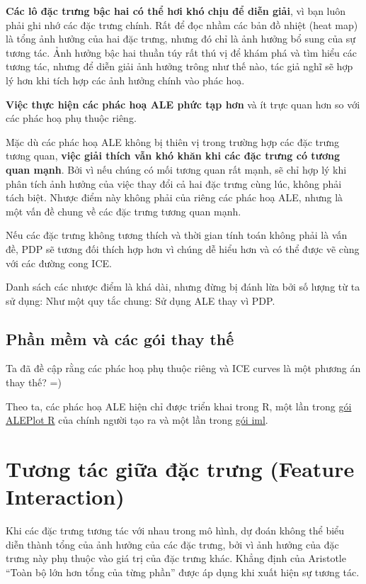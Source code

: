 \textbf{Các lô đặc trưng bậc hai có thể hơi khó chịu để diễn giải}, vì bạn luôn phải ghi nhớ các đặc trưng chính. Rất để đọc nhầm các bản đồ nhiệt (heat map) là tổng ảnh hưởng của hai đặc trưng, nhưng đó chỉ là ảnh hưởng bổ sung của sự tương tác. Ảnh hưởng bậc hai thuần túy rất thú vị để khám phá và tìm hiểu các tương tác, nhưng để diễn giải ảnh hưởng trông như thế nào, tác giả nghĩ sẽ hợp lý hơn khi tích hợp các ảnh hưởng chính vào phác hoạ.

\textbf{Việc thực hiện các phác hoạ ALE phức tạp hơn} và ít trực quan hơn so với các phác hoạ phụ thuộc riêng.

Mặc dù các phác hoạ ALE không bị thiên vị trong trường hợp các đặc trưng tương quan, \textbf{việc giải thích vẫn khó khăn khi các đặc trưng có tương quan mạnh}. Bởi vì nếu chúng có mối tương quan rất mạnh, sẽ chỉ hợp lý khi phân tích ảnh hưởng của việc thay đổi cả hai đặc trưng cùng lúc, không phải tách biệt. Nhược điểm này không phải của riêng các phác hoạ ALE, nhưng là một vấn đề chung về các đặc trưng tương quan mạnh.

Nếu các đặc trưng không tương thích và thời gian tính toán không phải là vấn đề, PDP sẽ tương đối thích hợp hơn vì chúng dễ hiểu hơn và có thể được vẽ cùng với các đường cong ICE.

Danh sách các nhược điểm là khá dài, nhưng đừng bị đánh lừa bởi số lượng từ ta sử dụng: Như một quy tắc chung: Sử dụng ALE thay vì PDP.

\subsection{Phần mềm và các gói thay thế}

Ta đã đề cập rằng các phác hoạ phụ thuộc riêng và ICE curves là một phương án thay thế? =)

Theo ta, các phác hoạ ALE hiện chỉ được triển khai trong R, một lần trong \href{https://cran.r-project.org/web/packages/ALEPlot/index.html}{gói ALEPlot R} của chính người tạo ra và một lần trong \href{https://cran.r-project.org/web/packages/iml/index.html}{gói iml}.

\clearpage
\section{Tương tác giữa đặc trưng (Feature Interaction)}
Khi các đặc trưng tương tác với nhau trong mô hình, dự đoán không thể biểu diễn thành tổng của ảnh hưởng của các đặc trưng, bởi vì ảnh hưởng của đặc trưng này phụ thuộc vào giá trị của đặc trưng khác. Khẳng định của Aristotle ``Toàn bộ lớn hơn tổng của từng phần'' được áp dụng khi xuất hiện sự tương tác.

